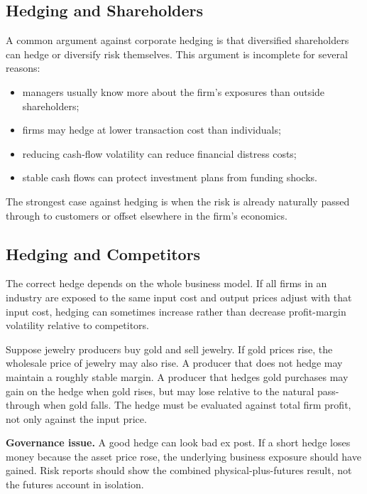 \subsection{Hedging and Shareholders}

A common argument against corporate hedging is that diversified shareholders can
hedge or diversify risk themselves. This argument is incomplete for several
reasons:
\begin{itemize}
    \item managers usually know more about the firm's exposures than outside
    shareholders;
    \item firms may hedge at lower transaction cost than individuals;
    \item reducing cash-flow volatility can reduce financial distress costs;
    \item stable cash flows can protect investment plans from funding shocks.
\end{itemize}

The strongest case against hedging is when the risk is already naturally passed
through to customers or offset elsewhere in the firm's economics.

\subsection{Hedging and Competitors}

The correct hedge depends on the whole business model. If all firms in an
industry are exposed to the same input cost and output prices adjust with that
input cost, hedging can sometimes increase rather than decrease profit-margin
volatility relative to competitors.

\begin{exmp}
Suppose jewelry producers buy gold and sell jewelry. If gold prices rise, the
wholesale price of jewelry may also rise. A producer that does not hedge may
maintain a roughly stable margin. A producer that hedges gold purchases may gain
on the hedge when gold rises, but may lose relative to the natural pass-through
when gold falls. The hedge must be evaluated against total firm profit, not only
against the input price.
\end{exmp}

\begin{boxF}
\textbf{Governance issue.} A good hedge can look bad ex post. If a short hedge
loses money because the asset price rose, the underlying business exposure should
have gained. Risk reports should show the combined physical-plus-futures result,
not the futures account in isolation.
\end{boxF}


